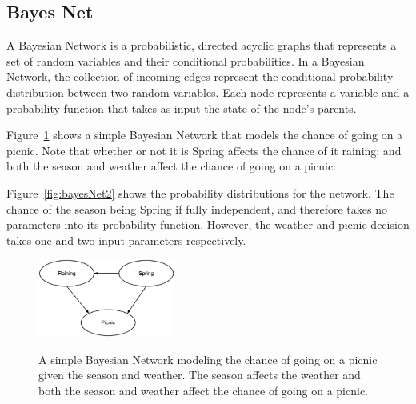 \documentclass[12pt]{ucthesis}
\newcommand{\captionfonts}{\small\bf\ssp}
\begin{document}
\subsection{Bayes Net}
\label{background-classifiers-bayes-net}
A Bayesian Network is a probabilistic, directed acyclic graphs that represents a set of random variables and their conditional probabilities.
In a Bayesian Network, the collection of incoming edges represent the conditional probability distribution between two random variables.
Each node represents a variable and a probability function that takes as input the state of the node's parents.\cite{Pearl}\cite{Neapolitan}

Figure~\ref{fig:bayesNet1} shows a simple Bayesian Network that models the chance of going on a picnic.
Note that whether or not it is Spring affects the chance of it raining; and both the season and weather
affect the chance of going on a picnic.

Figure~\ref{fig:bayesNet2} shows the probability distributions for the network. The chance of the season being Spring if
fully independent, and therefore takes no parameters into its probability function. However, the weather and picnic decision
takes one and two input parameters respectively.

\begin{figure}
   \begin{center}
      \includegraphics[width=0.4\textwidth]{images/Bayes_Net_1.eps}
      \captionfonts
      \caption[Simple Bayes Net]{A simple Bayesian Network modeling the chance of going on a picnic given the season and weather. The season affects the weather and both the season and weather affect the chance of going on a picnic.}
      \label{fig:bayesNet1}
   \end{center}
\end{figure}
\end{document}
